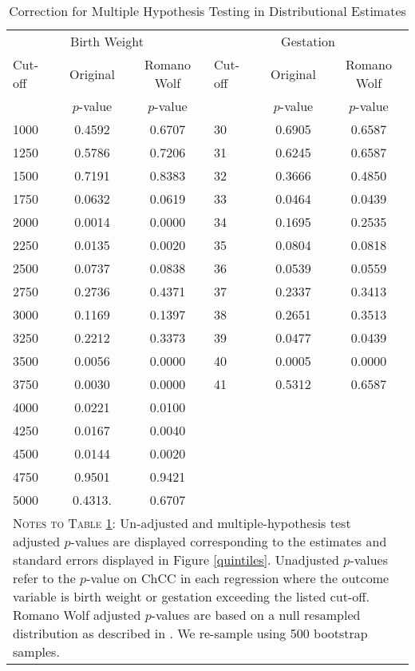 \documentclass[12pt]{article}
\begin{document}
\begin{spacing}{1.4}
\clearpage
\begin{table}[htpb!]
  \caption{Correction for Multiple Hypothesis Testing in Distributional Estimates}
  \label{tab:RWdist}
\begin{tabular}{lcclcc} \toprule
  \multicolumn{3}{c}{Birth Weight}&\multicolumn{3}{c}{Gestation} \\ \cmidrule(r){1-3} \cmidrule(r){4-6}
  Cut-off & Original & Romano Wolf &   Cut-off & Original & Romano Wolf \\
  & $p$-value & $p$-value  &           & $p$-value& $p$-value \\ \midrule
  1000 &0.4592 & 0.6707 & 30 & 0.6905 & 0.6587 \\
  1250 &0.5786 & 0.7206 & 31 & 0.6245 & 0.6587 \\
  1500 &0.7191 & 0.8383 &           32 & 0.3666 & 0.4850 \\
  1750 &0.0632 & 0.0619 &           33 & 0.0464 & 0.0439 \\
  2000 &0.0014 & 0.0000 &           34 & 0.1695 & 0.2535 \\
  2250 &0.0135 & 0.0020 &           35 & 0.0804 & 0.0818 \\
  2500 &0.0737 & 0.0838 &           36 & 0.0539 & 0.0559 \\
  2750 &0.2736 & 0.4371 &           37 & 0.2337 & 0.3413 \\
  3000 &0.1169 & 0.1397 &           38 & 0.2651 & 0.3513 \\
  3250 &0.2212 & 0.3373 &           39 & 0.0477 & 0.0439 \\
  3500 &0.0056 & 0.0000 &           40 & 0.0005 & 0.0000 \\
  3750 &0.0030 & 0.0000 &           41 & 0.5312 & 0.6587 \\
  4000 &0.0221 & 0.0100 &    && \\
  4250 &0.0167 & 0.0040 &    && \\
  4500 &0.0144 & 0.0020 &    && \\
  4750 &0.9501 & 0.9421 &    && \\
  5000 &0.4313. & 0.6707&    && \\ \midrule
  \multicolumn{6}{p{12cm}}{{\footnotesize \textsc{Notes to Table \ref{tab:RWdist}}: Un-adjusted and
      multiple-hypothesis test adjusted $p$-values are displayed corresponding to the estimates and
      standard errors displayed in Figure \ref{quintiles}.  Unadjusted $p$-values refer to the
      $p$-value on ChCC in each regression where the outcome variable is birth weight or gestation
      exceeding the listed cut-off.  Romano Wolf adjusted $p$-values are based on a null
      resampled distribution as described in \citet{RomanoWolf2005}.  We re-sample using 500
      bootstrap samples.}} \\ \bottomrule
\end{tabular}
\end{table}



\end{spacing}
\end{document}
